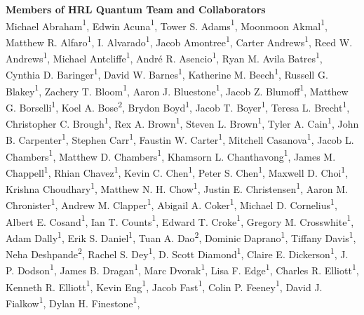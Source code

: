 \documentclass[aps,prl,twocolumn,superscriptaddress,nobibnotes,10pt,floatfix]{revtex4-2}
\newenvironment{widetext}{\vspace{2ex}}{\vspace{2ex}}
\begin{document}
	\ifarxiv
	\begin{widetext}
\renewcommand{\author}[1]{#1}
\newcommand{\HRL}{\textsuperscript{\scriptsize 1}}
\newcommand{\Boeing}{\textsuperscript{\scriptsize 2}}
\noindent
\textbf{Members of HRL Quantum Team and Collaborators}
\\
\noindent
\author{Michael Abraham}{\HRL},
\author{Edwin Acuna}{\HRL},
\author{Tower S. Adams}{\HRL},
\author{Moonmoon Akmal}{\HRL},
\author{Matthew R. Alfaro}{\HRL},
\author{I. Alvarado}{\HRL},
\author{Jacob Amontree}{\HRL},
\author{Carter Andrews}{\HRL},
\author{Reed W. Andrews}{\HRL},
\author{Michael Antcliffe}{\HRL},
\author{André R. Asencio}{\HRL},
\author{Ryan M. Avila Batres}{\HRL},
\author{Cynthia D. Baringer}{\HRL},
\author{David W. Barnes}{\HRL},
\author{Katherine M. Beech}{\HRL},
\author{Russell G. Blakey}{\HRL},
\author{Zachery T. Bloom}{\HRL},
\author{Aaron J. Bluestone}{\HRL},
\author{Jacob Z. Blumoff}{\HRL},
\author{Matthew G. Borselli}{\HRL},
\author{Koel A. Bose}{\Boeing},
\author{Brydon Boyd}{\HRL},
\author{Jacob T. Boyer}{\HRL},
\author{Teresa L. Brecht}{\HRL},
\author{Christopher C. Brough}{\HRL},
\author{Rex A. Brown}{\HRL},
\author{Steven L. Brown}{\HRL},
\author{Tyler A. Cain}{\HRL},
\author{John B. Carpenter}{\HRL},
\author{Stephen Carr}{\HRL},
\author{Faustin W. Carter}{\HRL},
\author{Mitchell Casanova}{\HRL},
\author{Jacob L. Chambers}{\HRL},
\author{Matthew D. Chambers}{\HRL},
\author{Khamsorn L. Chanthavong}{\HRL},
\author{James M. Chappell}{\HRL},
\author{Rhian Chavez}{\HRL},
\author{Kevin C. Chen}{\HRL},
\author{Peter S. Chen}{\HRL},
\author{Maxwell D. Choi}{\HRL},
\author{Krishna Choudhary}{\HRL},
\author{Matthew N. H. Chow}{\HRL},
\author{Justin E. Christensen}{\HRL},
\author{Aaron M. Chronister}{\HRL},
\author{Andrew M. Clapper}{\HRL},
\author{Abigail A. Coker}{\HRL},
\author{Michael D. Cornelius}{\HRL},
\author{Albert E. Cosand}{\HRL},
\author{Ian T. Counts}{\HRL},
\author{Edward T. Croke}{\HRL},
\author{Gregory M. Crosswhite}{\HRL},
\author{Adam Dally}{\HRL},
\author{Erik S. Daniel}{\HRL},
\author{Tuan A. Dao}{\Boeing},
\author{Dominic Daprano}{\HRL},
\author{Tiffany Davis}{\HRL},
\author{Neha Deshpande}{\Boeing},
\author{Rachel S. Dey}{\HRL},
\author{D. Scott Diamond}{\HRL},
\author{Claire E. Dickerson}{\HRL},
\author{J. P. Dodson}{\HRL},
\author{James B. Dragan}{\HRL},
\author{Marc Dvorak}{\HRL},
\author{Lisa F. Edge}{\HRL},
\author{Charles R. Elliott}{\HRL},
\author{Kenneth R. Elliott}{\HRL},
\author{Kevin Eng}{\HRL},
\author{Jacob Fast}{\HRL},
\author{Colin P. Feeney}{\HRL},
\author{David J. Fialkow}{\HRL},
\author{Dylan H. Finestone}{\HRL},

\end{widetext}
\end{document}

